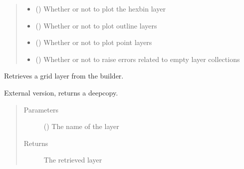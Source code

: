 \documentclass[letterpaper,10pt,english]{sphinxmanual}
\begin{document}
\begin{fulllineitems}
\begin{fulllineitems}
\begin{quote}
\begin{description}
\begin{itemize}
\item {} 
\sphinxAtStartPar
{} () \textendash{} Whether or not to plot the hexbin layer

\item {} 
\sphinxAtStartPar
{} () \textendash{} Whether or not to plot outline layers

\item {} 
\sphinxAtStartPar
{} () \textendash{} Whether or not to plot point layers

\item {} 
\sphinxAtStartPar
{} () \textendash{} Whether or not to raise errors related to empty layer collections

\end{itemize}

\end{description}\end{quote}

\end{fulllineitems}


\begin{fulllineitems}
\label{\detokenize{builder:geohexviz.builder.PlotBuilder.get_grid}}
\sphinxAtStartPar
Retrieves a grid layer from the builder.

\sphinxAtStartPar
External version, returns a deepcopy.
\begin{quote}\begin{description}
\item[{Parameters}] \leavevmode
\sphinxAtStartPar
{} () \textendash{} The name of the layer

\item[{Returns}] \leavevmode
\sphinxAtStartPar
The retrieved layer


\end{description}
\end{quote}
\end{fulllineitems}
\end{fulllineitems}
\end{document}
